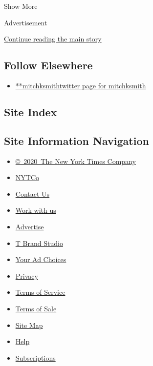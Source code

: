 Show More

Advertisement

\protect\hyperlink{after-mid2}{Continue reading the main story}

\hypertarget{follow-elsewhere}{%
\subsection{Follow Elsewhere}\label{follow-elsewhere}}

\begin{itemize}
\tightlist
\item
  \href{https://twitter.com/mitchksmith}{**mitchksmithtwitter page for
  mitchksmith}
\end{itemize}

\hypertarget{site-index}{%
\subsection{Site Index}\label{site-index}}

\hypertarget{site-information-navigation}{%
\subsection{Site Information
Navigation}\label{site-information-navigation}}

\begin{itemize}
\tightlist
\item
  \href{https://help.nytimes3xbfgragh.onion/hc/en-us/articles/115014792127-Copyright-notice}{©~2020~The
  New York Times Company}
\end{itemize}

\begin{itemize}
\tightlist
\item
  \href{https://www.nytco.com/}{NYTCo}
\item
  \href{https://help.nytimes3xbfgragh.onion/hc/en-us/articles/115015385887-Contact-Us}{Contact
  Us}
\item
  \href{https://www.nytco.com/careers/}{Work with us}
\item
  \href{https://nytmediakit.com/}{Advertise}
\item
  \href{http://www.tbrandstudio.com/}{T Brand Studio}
\item
  \href{https://www.nytimes3xbfgragh.onion/privacy/cookie-policy\#how-do-i-manage-trackers}{Your
  Ad Choices}
\item
  \href{https://www.nytimes3xbfgragh.onion/privacy}{Privacy}
\item
  \href{https://help.nytimes3xbfgragh.onion/hc/en-us/articles/115014893428-Terms-of-service}{Terms
  of Service}
\item
  \href{https://help.nytimes3xbfgragh.onion/hc/en-us/articles/115014893968-Terms-of-sale}{Terms
  of Sale}
\item
  \href{https://spiderbites.nytimes3xbfgragh.onion}{Site Map}
\item
  \href{https://help.nytimes3xbfgragh.onion/hc/en-us}{Help}
\item
  \href{https://www.nytimes3xbfgragh.onion/subscription?campaignId=37WXW}{Subscriptions}
\end{itemize}
